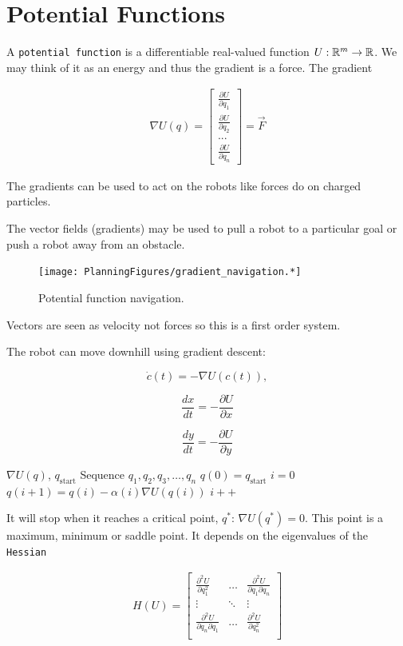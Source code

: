 \hypertarget{potential-functions}{%
\section{Potential Functions}\label{potential-functions}}

A \texttt{potential\ function} is a differentiable real-valued function
\(U: {\Bbb R}^m \to {\Bbb R}\). We may think of it as an energy and thus
the gradient is a force. The gradient

\[\begin{aligned}
\nabla U(q) = \begin{bmatrix}\displaystyle \frac{\partial U}{\partial q_1} \\[4mm]
\displaystyle \frac{\partial U}{\partial q_2} \\[2mm] ... \\[2mm]
\displaystyle \frac{\partial U}{\partial q_n} \end{bmatrix} = \vec{F}
\end{aligned}\]

The gradients can be used to act on the robots like forces do on charged
particles.

The vector fields (gradients) may be used to pull a robot to a
particular goal or push a robot away from an obstacle.

\begin{figure}
\centering
\texttt{[image: PlanningFigures/gradient\_navigation.*]}
\caption{Potential function navigation.}
\end{figure}

Vectors are seen as velocity not forces so this is a first order system.

The robot can move downhill using gradient descent:

\[\dot{c}(t) = -\nabla U(c(t)),\]

\[\displaystyle \frac{dx}{dt} = -\frac{\partial U}{\partial x}\]

\[\displaystyle \frac{dy}{dt} = -\frac{\partial U}{\partial y}\]

\(\nabla U(q)\), \(q_\text{start}\) Sequence
\(q_1, q_2, q_3, \dots , q_n\) \(q(0)=q_\text{start}\) \(i=0\)
\(q(i+1) = q(i) - \alpha (i) \nabla U(q(i))\) \(i++\)

It will stop when it reaches a critical point, \(q^*\):
\(\nabla U(q^*)=0.\) This point is a maximum, minimum or saddle point.
It depends on the eigenvalues of the \texttt{Hessian}

\[\begin{aligned}
H(U) = \begin{bmatrix}
          \displaystyle\frac{\partial^2 U}{\partial q_1^2} & \dots & \displaystyle\frac{\partial^2 U}{\partial q_1\partial q_n}\\[5mm]
          \displaystyle \vdots & \ddots & \vdots\\[5mm]
          \displaystyle\frac{\partial^2 U}{\partial q_n\partial q_1}  & \dots & \displaystyle\frac{\partial^2 U}{\partial q_n^2}\\[5mm]
         \end{bmatrix}
\end{aligned}\]

